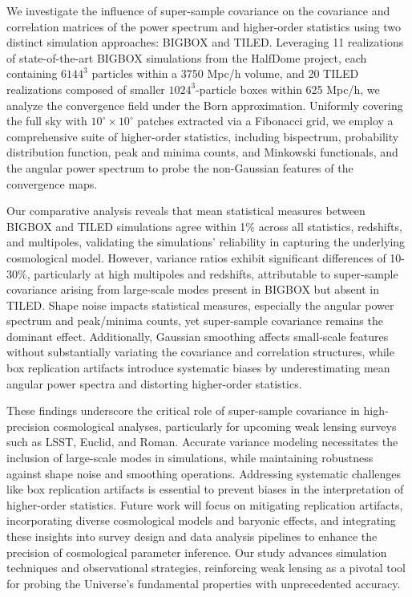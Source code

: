 We investigate the influence of super-sample covariance on the covariance and correlation matrices of the power spectrum and higher-order statistics using two distinct simulation approaches: BIGBOX and TILED. Leveraging 11 realizations of state-of-the-art BIGBOX simulations from the HalfDome project, each containing $6144^3$ particles within a 3750 Mpc/h volume, and 20 TILED realizations composed of smaller $1024^3$-particle boxes within 625 Mpc/h, we analyze the convergence field under the Born approximation. Uniformly covering the full sky with $10^\circ \times 10^\circ$ patches extracted via a Fibonacci grid, we employ a comprehensive suite of higher-order statistics, including bispectrum, probability distribution function, peak and minima counts, and Minkowski functionals, and the angular power spectrum to probe the non-Gaussian features of the convergence maps.

Our comparative analysis reveals that mean statistical measures between BIGBOX and TILED simulations agree within 1\% across all statistics, redshifts, and multipoles, validating the simulations' reliability in capturing the underlying cosmological model. However, variance ratios exhibit significant differences of 10-30\%, particularly at high multipoles and redshifts, attributable to super-sample covariance arising from large-scale modes present in BIGBOX but absent in TILED. Shape noise impacts statistical measures, especially the angular power spectrum and peak/minima counts, yet super-sample covariance remains the dominant effect. Additionally, Gaussian smoothing affects small-scale features without substantially variating the covariance and correlation structures, while box replication artifacts introduce systematic biases by underestimating mean angular power spectra and distorting higher-order statistics.

These findings underscore the critical role of super-sample covariance in high-precision cosmological analyses, particularly for upcoming weak lensing surveys such as LSST, Euclid, and Roman. Accurate variance modeling necessitates the inclusion of large-scale modes in simulations, while maintaining robustness against shape noise and smoothing operations. Addressing systematic challenges like box replication artifacts is essential to prevent biases in the interpretation of higher-order statistics. Future work will focus on mitigating replication artifacts, incorporating diverse cosmological models and baryonic effects, and integrating these insights into survey design and data analysis pipelines to enhance the precision of cosmological parameter inference. Our study advances simulation techniques and observational strategies, reinforcing weak lensing as a pivotal tool for probing the Universe's fundamental properties with unprecedented accuracy.